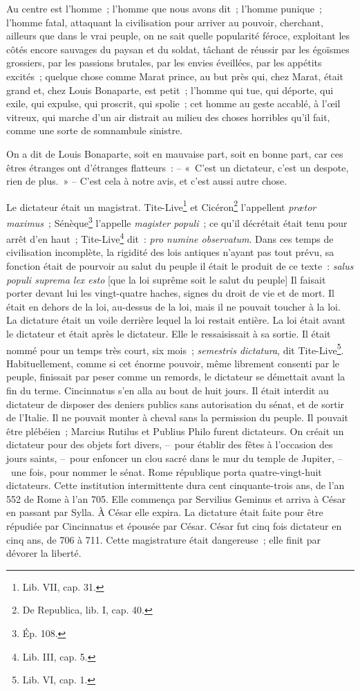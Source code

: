 \documentclass[french,twoside]{book} %
\begin{document}
\noindent Au centre est l’homme ; l’homme que nous avons dit ; l’homme punique ; l’homme fatal, attaquant la civilisation pour arriver au pouvoir, cherchant, ailleurs que dans le vrai peuple, on ne sait quelle popularité féroce, exploitant les côtés encore sauvages du paysan et du soldat, tâchant de réussir par les égoïsmes grossiers, par les passions brutales, par les envies éveillées, par les appétits excités ; quelque chose comme Marat prince, au but près qui, chez Marat, était grand et, chez Louis Bonaparte, est petit ; l’homme qui tue, qui déporte, qui exile, qui expulse, qui proscrit, qui spolie ; cet homme au geste accablé, à l’œil vitreux, qui marche d’un air distrait au milieu des choses horribles qu’il fait, comme une sorte de somnambule sinistre.\par
On a dit de Louis Bonaparte, soit en mauvaise part, soit en bonne part, car ces êtres étranges ont d’étranges flatteurs : – « C’est un dictateur, c’est un despote, rien de plus. » – C’est cela à notre avis, et c’est aussi autre chose.\par
Le dictateur était un magistrat. Tite-Live\footnote{Lib. VII, cap. 31.} et Cicéron\footnote{De Republica, lib. I, cap. 40.} l’appellent \emph{prætor maximus} ; Sénèque\footnote{Ép. 108.} l’appelle \emph{magister populi} ; ce qu’il décrétait était tenu pour arrêt d’en haut ; Tite-Live\footnote{Lib. III, cap. 5.} dit : \emph{pro numine observatum}. Dans ces temps de civilisation incomplète, la rigidité des lois antiques n’ayant pas tout prévu, sa fonction était de pourvoir au salut du peuple il était le produit de ce texte : \emph{salus populi suprema lex esto} [que la loi suprême soit le salut du peuple] Il faisait porter devant lui les vingt-quatre haches, signes du droit de vie et de mort. Il était en dehors de la loi, au-dessus de la loi, mais il ne pouvait toucher à la loi. La dictature était un voile derrière lequel la loi restait entière. La loi était avant le dictateur et était après le dictateur. Elle le ressaisissait à sa sortie. Il était nommé pour un temps très court, six mois ; \emph{semestris dictatura}, dit Tite-Live\footnote{Lib. VI, cap. 1.}. Habituellement, comme si cet énorme pouvoir, même librement consenti par le peuple, finissait par peser comme un remords, le dictateur se démettait avant la fin du terme. Cincinnatus s’en alla au bout de huit jours. Il était interdit au dictateur de disposer des deniers publics sans autorisation du sénat, et de sortir de l’Italie. Il ne pouvait monter à cheval sans la permission du peuple. Il pouvait être plébéien ; Marcius Rutilus et Publius Philo furent dictateurs. On créait un dictateur pour des objets fort divers, – pour établir des fêtes à l’occasion des jours saints, – pour enfoncer un clou sacré dans le mur du temple de Jupiter, – une fois, pour nommer le sénat. Rome république porta quatre-vingt-huit dictateurs. Cette institution intermittente dura cent cinquante-trois ans, de l’an 552 de Rome à l’an 705. Elle commença par Servilius Geminus et arriva à César en passant par Sylla. À César elle expira. La dictature était faite pour être répudiée par Cincinnatus et épousée par César. César fut cinq fois dictateur en cinq ans, de 706 à 711. Cette magistrature était dangereuse ; elle finit par dévorer la liberté.\par
\end{document}
